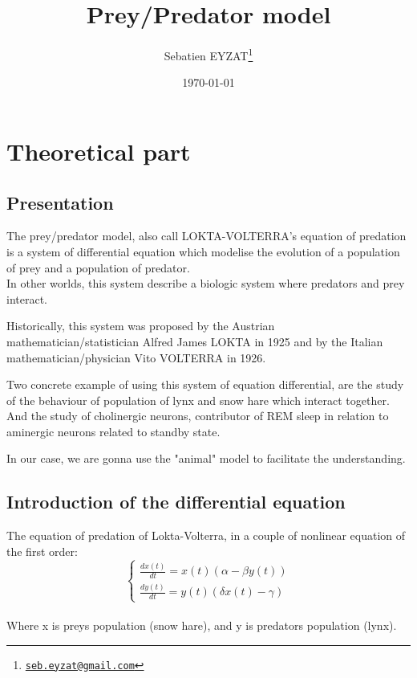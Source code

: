 \documentclass[a4paper,16pt,twoside]{report}
\title{Prey/Predator model}
\date{\today}
\author{Sebatien EYZAT\thanks{\href{seb.eyzat@gmail.com}{\tt seb.eyzat@gmail.com}}
}
\begin{document}
\maketitle

\cleardoublepage
\tableofcontents

\chapter{Theoretical part}
\section{Presentation}
The prey/predator model, also call LOKTA-VOLTERRA's equation of predation is a system of differential equation which modelise the evolution of a population of prey and a population of predator. \\
In other worlds, this system describe a biologic system where predators and prey interact.


Historically, this system was proposed by the Austrian mathematician/statistician Alfred James LOKTA in 1925 and by the Italian mathematician/physician Vito VOLTERRA in 1926.


Two concrete example of using this system of equation differential, are the study of the behaviour of population of lynx and snow hare which interact together. And the study of cholinergic neurons, contributor of REM sleep in relation to aminergic neurons related to standby state.


In our case, we are gonna use the "animal" model to facilitate the understanding.
\section{Introduction of the differential equation}
The equation of predation of Lokta-Volterra, in a couple of nonlinear equation of the first order:\\
\begin{equation}
   \left\{
    \begin{array}{rcr}
    \frac{dx(t)}{dt}=x(t)(\alpha - \beta y(t))\\
    \frac{dy(t)}{dt}=y(t)(\delta x(t)- \gamma)
    \end{array}
		\right.
\end{equation}\\




Where x is preys population (snow hare), and y is predators population (lynx).\\
\end{document}
